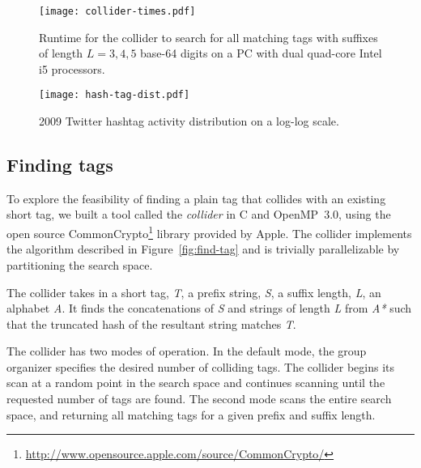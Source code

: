 
\begin{figure*}[t]
\begin{minipage}[b]{0.48\linewidth}
\centering
\texttt{[image: collider-times.pdf]}
    \caption{Runtime for the collider to search for all matching tags with
  suffixes of length $L=3,4,5$ base-64 digits on a PC with dual quad-core Intel i5
  processors.}\label{fig:collider-times}
\end{minipage}
\hspace{0.5cm}
\begin{minipage}[b]{0.48\linewidth}
\centering
\texttt{[image: hash-tag-dist.pdf]}
\caption{2009 Twitter hashtag activity distribution on a log-log
  scale.\vspace{0.4cm}\label{fig:hash-dist}
}
\end{minipage}
\end{figure*}

\subsection{Finding tags}
\label{sec:collider}

To explore the feasibility of finding a plain tag that collides with an
existing short tag, we built a tool called the {\em collider} in C and
OpenMP~3.0, using the open source CommonCrypto\footnote{\url{http://www.opensource.apple.com/source/CommonCrypto/}} library provided
by Apple. The collider implements the  algorithm
described in Figure~\ref{fig:find-tag} and is trivially parallelizable
by partitioning the search space.

The collider takes in a short tag, \textit{T}, a prefix string,
\textit{S}, a suffix length, \textit{L}, an alphabet \textit{A}. It
finds the concatenations of \textit{S} and strings of length \textit{L}
from \textit{A*} such that the truncated hash of the resultant string
matches \textit{T}.

The collider has two modes of operation. In the default mode, the
group organizer specifies the desired number of colliding tags. The collider begins its
scan at a random point in the search space and continues scanning until
the requested number of tags are found. The second mode scans the entire
search space, and returning all matching tags for a given prefix
and suffix length.

